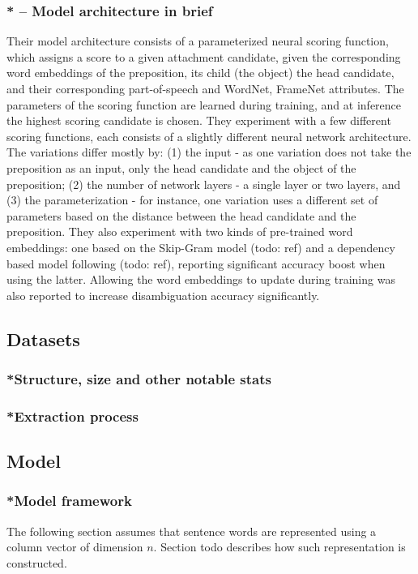 \subsubsection{* -- Model architecture in brief}
Their model architecture consists of a parameterized neural scoring function, which assigns a score to a given attachment candidate, given the corresponding word embeddings of the preposition, its child (the object) the head candidate, and their corresponding part-of-speech and WordNet, FrameNet attributes. The parameters of the scoring function are learned during training, and at inference the highest scoring candidate is chosen. They experiment with a few different scoring functions, each consists of a slightly different neural network architecture. The variations differ mostly by: (1)  the input - as one variation does not take the preposition as an input, only the head candidate and the object of the preposition; (2) the number of network layers - a single layer or two layers, and (3) the parameterization - for instance, one variation uses a different set of parameters based on the distance between the head candidate and the preposition. They also experiment with two kinds of pre-trained word embeddings: one based on the Skip-Gram model (todo: ref) and a dependency based model following (todo: ref), reporting significant accuracy boost when using the latter. Allowing the word embeddings to update during training was also reported to increase disambiguation accuracy significantly. 

\subsection{Datasets}
\subsubsection{*Structure, size and other notable stats}
\subsubsection{*Extraction process}

\subsection{Model}
\subsubsection{*Model framework}
The following section assumes that sentence words are represented using a column vector of dimension $n$. Section todo describes how such representation is constructed. 

